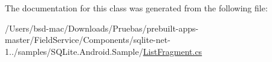The documentation for this class was generated from the following file\+:\begin{DoxyCompactItemize}
\item 
/\+Users/bsd-\/mac/\+Downloads/\+Pruebas/prebuilt-\/apps-\/master/\+Field\+Service/\+Components/sqlite-\/net-\/1../samples/\+S\+Q\+Lite.\+Android.\+Sample/\hyperlink{_list_fragment_8cs}{List\+Fragment.\+cs}\end{DoxyCompactItemize}
